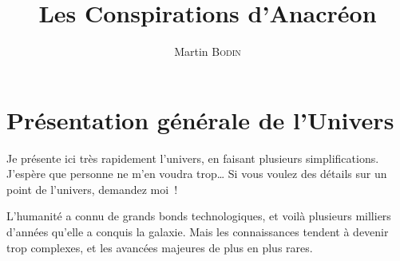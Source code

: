


\newcommand{\forplayer}{y}
\newcommand{\theplayer}{numjoueur}
\newcommand{\manyColored}{n}



\title{Les Conspirations d’Anacréon}
\author{Martin \textsc{Bodin}}
\date{}



\maketitle

\tableofcontents

\newpage

\newlength{\annee}
\settowidth{\annee}{Années 10 000}
\newlength{\texte}
\setlength{\texte}{\textwidth} \addtolength{\texte}{-\annee} 
	\addtolength{\texte}{-2\tabcolsep}

\section{Présentation générale de l’Univers}

Je présente ici très rapidement l’univers, en faisant plusieurs simplifications.
J’espère que personne ne m’en voudra trop…
Si vous voulez des détails sur un point de l’univers, demandez moi~!

L’humanité a connu de grands bonds technologiques, et voilà plusieurs milliers d’années qu’elle a conquis la galaxie.  Mais les connaissances tendent à devenir trop complexes, et les avancées majeures de plus en plus rares.\\[5pt]

